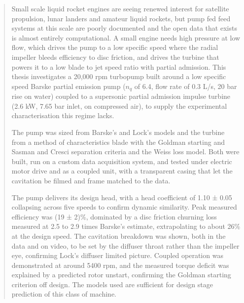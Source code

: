 \begin{abstract}
Small scale liquid rocket engines are seeing renewed interest for satellite propulsion, lunar landers and amateur liquid rockets, but pump fed feed systems at this scale are poorly documented and the open data that exists is almost entirely computational. A small engine needs high pressure at low flow, which drives the pump to a low specific speed where the radial impeller bleeds efficiency to disc friction, and drives the turbine that powers it to a low blade to jet speed ratio with partial admission. This thesis investigates a 20,000 rpm turbopump built around a low specific speed Barske partial emission pump ($n_q$ of 6.4, flow rate of 0.3 L/s, 20 bar rise on water) coupled to a supersonic partial admission impulse turbine (2.6 kW, 7.65 bar inlet, on compressed air), to supply the experimental characterisation this regime lacks.

The pump was sized from Barske's and Lock's models and the turbine from a method of characteristics blade with the Goldman starting and Sasman and Cresci separation criteria and the Weiss loss model. Both were built, run on a custom data acquisition system, and tested under electric motor drive and as a coupled unit, with a transparent casing that let the cavitation be filmed and frame matched to the data.

The pump delivers its design head, with a head coefficient of 1.10 ± 0.05 collapsing across five speeds to confirm dynamic similarity. Peak measured efficiency was (19 ± 2)\%, dominated by a disc friction churning loss measured at 2.5 to 2.9 times Barske's estimate, extrapolating to about 26\% at the design speed. The cavitation breakdown was shown, both in the data and on video, to be set by the diffuser throat rather than the impeller eye, confirming Lock's diffuser limited picture. Coupled operation was demonstrated at around 5400 rpm, and the measured torque deficit was explained by a predicted rotor unstart, confirming the Goldman starting criterion off design. The models used are sufficient for design stage prediction of this class of machine.
\end{abstract}
